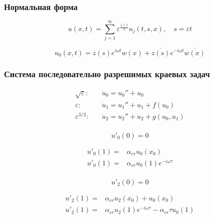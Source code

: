 \documentclass[fullscreen=true, unicode, bookmarks=false]{beamer}
\begin{document}
\begin{frame}
\frametitle{Нормальная форма}

\begin{equation}
	u(x,t) = \sum_{j=1}^{\infty} \varepsilon^\frac{j+1}{2}u_j (t,s,x), \quad s = \varepsilon t
\end{equation}

\vspace{1.5cm}

\begin{equation}
	u_{0}(x,t) = z(s)e^{i \omega t} w(x) + \overline{z(s)}e^{-i \omega t}\overline{w(x)}
\end{equation}

\end{frame}

\begin{frame}
\frametitle{ Система последовательно разрешимых краевых задач }

\begin{equation}
	\begin{aligned}
		\sqrt{\varepsilon}:& \quad \dot{u}_{0} = u_{0}'' + u_{0} \\
		\varepsilon:& \quad \dot{u}_{1} = u_{1}'' + u_{1} + f( u_{0}) \\
		\varepsilon^{3/2}:& \quad \dot{u}_{2} = u_{2}'' + u_{2} + g(u_{0},u_{1}) \\
	\end{aligned}
\end{equation}

\end{frame}

\begin{frame}
	\begin{equation}
		u'_{0}(0)=0
	\end{equation}

\medskip		
	
	\begin{equation}
		\begin{aligned}
			u'_{0}(1) = & \alpha_{cr}u_{0}(x_{0})\\
			u'_{0}(1) = & \alpha_{cr}u_{0}(1)e^{-i \omega \tau}\\
		\end{aligned}
	\end{equation}
	
\medskip 
	
	\begin{equation}
		u'_{2}(0)=0
	\end{equation}
	
\medskip		
	
	\begin{equation}
		\begin{aligned}
			u'_{2}(1) = & \alpha_{cr}u_{2}(x_{0}) + u_{0}(x_{0})\\
			u'_{2}(1) = & \alpha_{cr}u_{2}(1)e^{-i \omega \tau} - \alpha_{cr}\tau u_{0}(1)\\
		\end{aligned}
	\end{equation}
\end{frame}
\end{document}
